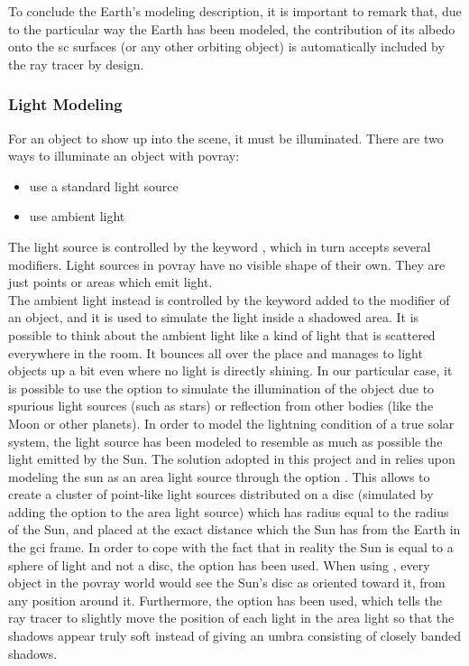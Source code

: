 To conclude the Earth's modeling description, it is important to remark that, due to the particular way the Earth has been modeled, the contribution of its albedo onto the \acrshort{sc} surfaces (or any other orbiting object) is automatically included by the ray tracer by design.

\subsubsection{Light Modeling}
For an object to show up into the scene, it must be illuminated.
There are two ways to illuminate an object with \acrshort{povray}:

\begin{itemize}
  \item use a standard light source
  \item use ambient light
\end{itemize}

The light source is controlled by the keyword , which in turn accepts several modifiers. Light sources in \acrshort{povray} have no visible shape of their own. They are just points or areas which emit light.\\
The ambient light instead is controlled by the keyword  added to the  modifier of an object, and it is used to simulate the light inside a shadowed area.
It is possible to think about the ambient light like a kind of light that is scattered everywhere in the room. It bounces all over the place and manages to light objects up a bit even where no light is directly shining.
In our particular case, it is possible to use the  option to simulate the illumination of the object due to spurious light sources (such as stars) or reflection from other bodies (like the Moon or other planets).
In order to model the lightning condition of a true solar system, the light source has been modeled to resemble as much as possible the light emitted by the Sun.
The solution adopted in this project and in \cite{jacopo} relies upon modeling the sun as an area light source through the option . This allows to create a cluster of point-like light sources distributed on a disc (simulated by adding the  option to the area light source) which has radius equal to the radius of the Sun, and placed at the exact distance which the Sun has from the Earth in the \acrshort{gci} frame. In order to cope with the fact that in reality the Sun is equal to a sphere of light and not a disc, the option  has been used. When using , every object in the \acrshort{povray} world would see the Sun's disc as oriented toward it, from any position around it.
Furthermore, the option  has been used, which tells the ray tracer to slightly move the position of each light in the area light so that the shadows appear truly soft instead of giving an umbra consisting of closely banded shadows.

